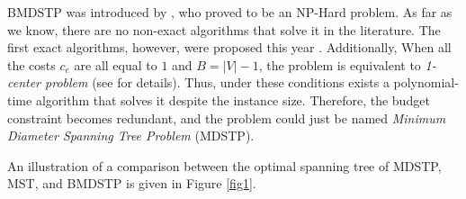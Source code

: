 \documentclass[12pt]{article}
\begin{document}
BMDSTP was introduced by \cite {Plesnik1981}, who proved to be an NP-Hard problem. As far as we know, there are no non-exact algorithms that solve it in the literature. The first exact algorithms, however, were proposed this year \cite{}. Additionally, When all the costs $c_e$ are all equal to $1$ and $B = |V|-1$, the problem is equivalent to \textit {1-center problem} (see \cite {Hakimi1978} for details). Thus, 
under these conditions exists a polynomial-time algorithm that solves it despite the instance size. Therefore, the budget constraint becomes redundant, and the problem could just be named \textit{Minimum Diameter Spanning Tree Problem} (MDSTP).

An illustration of a comparison between the optimal spanning tree of MDSTP, MST, and BMDSTP is given in Figure \ref{fig1}.
\end{document}
